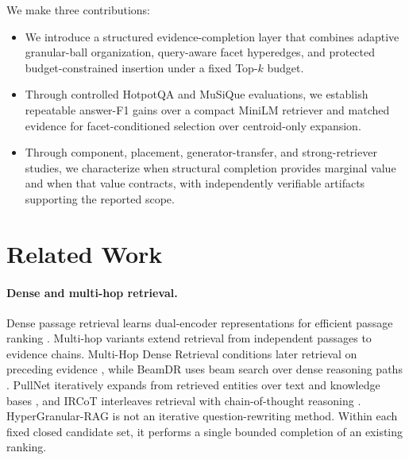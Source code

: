 \documentclass[11pt]{article}
\newcommand{\hgrag}{HyperGranular-RAG\xspace}
\begin{document}
We make three contributions:
\begin{itemize}
  \item We introduce a structured evidence-completion layer that combines
        adaptive granular-ball organization, query-aware facet hyperedges, and
        protected budget-constrained insertion under a fixed Top-$k$ budget.
  \item Through controlled HotpotQA and MuSiQue evaluations, we establish
        repeatable answer-F1 gains over a compact MiniLM retriever and matched
        evidence for facet-conditioned selection over centroid-only expansion.
  \item Through component, placement, generator-transfer, and strong-retriever
        studies, we characterize when structural completion provides marginal
        value and when that value contracts, with independently verifiable
        artifacts supporting the reported scope.
\end{itemize}

\section{Related Work}

\paragraph{Dense and multi-hop retrieval.}
Dense passage retrieval learns dual-encoder representations for efficient
passage ranking \citep{karpukhin2020dpr}. Multi-hop variants extend retrieval
from independent passages to evidence chains. Multi-Hop Dense Retrieval
conditions later retrieval on preceding evidence \citep{xiong2021mdr}, while
BeamDR uses beam search over dense reasoning paths \citep{zhao2021beamdr}.
PullNet iteratively expands from retrieved entities over text and knowledge
bases \citep{sun2019pullnet}, and IRCoT interleaves retrieval with
chain-of-thought reasoning \citep{trivedi2023ircot}. \hgrag is not an iterative
question-rewriting method. Within each fixed closed candidate set, it performs
a single bounded completion of an existing ranking.
\end{document}
